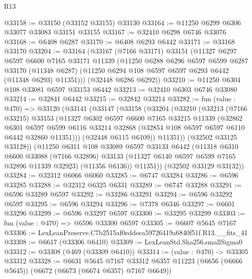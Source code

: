 \begin{lexlean}{R13}
\begin{coremodule}
@33158 := @33150 (@33152 @33155) @33130
@33164 := @11250 @6299 @6306 @33077 @33083 @33151 @33155
@33167 := @32410 @6298 @6746 @33076
@33168 := @6408 @6287
@33170 := @6408 @6293 @6442
@33171 := @33168 @33170
@33204 := @33164
    (@33167
      (@7166 @33171)
      @33151
      (@11327
        @6297
        @6597
        @6600
        @7165
        @33171
        @11339
        (@11250
          @6288
          @6296
          @6597
          @6599
          @6287
          @33170
          (@11348 @6287)
          (@11250 @6294 @108 @6597 @6597 @6293 @6442 (@11348 @6293) @11351)))
      (@32448 @6286 @6292))
@33210 := @11250 @6304 @108 @33081 @6597 @33153 @6442
@33213 := @32410 @6303 @6746 @33080
@33214 := @32841 @6442
@33215 := @32842 @33214
@33282 := fun (value : @470) =>
  @33120
    (@33141
      (@33147
        (@33158
          (@33204
            (@33210
              (@33213
                (@7166 @33215)
                @33153
                (@11327
                  @6302
                  @6597
                  @6600
                  @7165
                  @33215
                  @11339
                  (@32862
                    @6301
                    @6597
                    @6599
                    @6116
                    @33214
                    @32868
                    (@32854 @108 @6597 @6597 @6110 @6442 @32860 @11351)))
                (@32448 @6115 @6109))
              @11351))
          (@32502 @33125 @33128))
        (@11250
          @6311
          @108
          @33089
          @6597
          @33133
          @6442
          (@11318
            @6310
            @6600
            @33088
            (@7166 @32896)
            @33133
            (@11327 @6140 @6597 @6599 @7165 @32896 @11339 @32923)
            (@11356 @6136))
          @11351))
      (@32502 @33129 @33132))
@33284 := @32312 @6066 @6060
@33285 := @6747 @33284
@33286 := @6596 @33285
@33288 := @32312 @6325 @6331
@33289 := @6747 @33288
@33291 := @6596 @33289 @6597
@33292 := @33286 @33291
@33294 := @6596 @33292 @6597
@33295 := @6596 @33294
@33296 := @7378 @6346
@33297 := @6601 @33296
@33299 := @6596 @33297 @6597
@33300 := @33295 @33299
@33303 := fun (value : @470) => @6596 @33300 @6597
@33305 := @6607 @5645 @7167
@33306 := LexLeanPreserve.C7b2515af0eddeea59726419a6840f51f.R13.__fits_41
@33308 := @6617 (@33306 @6410)
@33309 := LexLeanStd.Sha256.smallSigma0
@33312 := @33308 (@469 (@33309 @6410))
@33314 := (value : @470) -> @33305 @33312
@33328 := @6631
    @5645
    @7167
    @33312
    @6357
    @11223
    (@6656 (@6666 @5645))
    (@6672 (@6673 (@6674 @6357) @7167 @6649))

\end{coremodule}
\end{lexlean}
